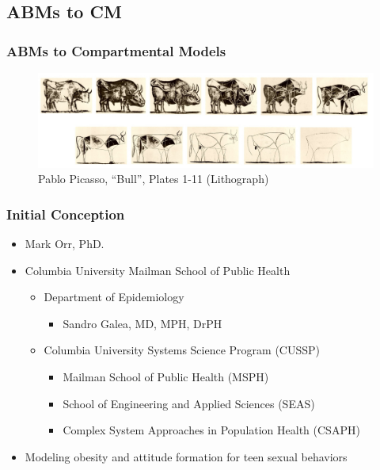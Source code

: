 \documentclass[compress]{beamer}
\begin{document}
\subsection{ABMs to CM}
    \begin{frame}[Basic2] \frametitle{ABMs to Compartmental Models}
        \begin{figure}
            \centering
            \includegraphics[width=1.0\linewidth]{../figures/Picasso-The-Bull-Lithographs-1-10}
            \caption{Pablo Picasso, ``Bull'', Plates 1-11 (Lithograph)}
            \label{fig:picasso-the-bull-lithographs-1-10}
        \end{figure}
    \end{frame}

\begin{frame}[Basic2] \frametitle{Initial Conception}
    \begin{itemize}
        \item Mark Orr, PhD.
        \item Columbia University Mailman School of Public Health
        \begin{itemize}
            \item Department of Epidemiology
            \begin{itemize}
                \item Sandro Galea, MD, MPH, DrPH
            \end{itemize}
            \item Columbia University Systems Science Program (CUSSP)
            \begin{itemize}
                \item Mailman School of Public Health (MSPH)
                \item School of Engineering and Applied Sciences (SEAS)
                \item Complex System Approaches in Population Health (CSAPH)
            \end{itemize}
        \end{itemize}
        \item Modeling obesity and attitude formation for teen sexual behaviors
    \end{itemize}
\end{frame}
\end{document}
